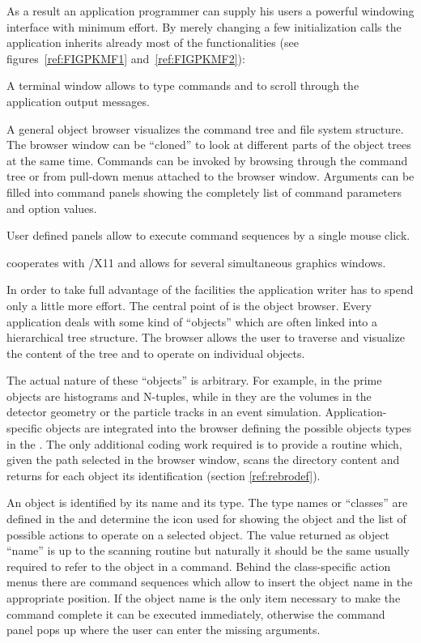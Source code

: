 As a result an application programmer can supply his users a powerful
windowing interface with minimum effort.
By merely changing a few \KUIP{} initialization calls the application
inherits already most of the \KUIPMotif{} functionalities 
(see figures~\ref{ref:FIGPKMF1} and~\ref{ref:FIGPKMF2}):
\begin{UL}
\item
A terminal window allows to type commands and to scroll through the
application output messages.
\item
A general object browser visualizes the command tree and file system
structure.
The browser window can be ``cloned'' to look at different parts of the
object trees at the same time.
Commands can be invoked by browsing through the command tree or from
pull-down menus attached to the browser window.
Arguments can be filled into command panels showing the completely list
of command parameters and option values.
\item
User defined panels allow to execute command sequences by a single
mouse click.
\item
\KUIPMotif{} cooperates with \HIGZ{}/X11 and allows for
several simultaneous graphics windows.
\end{UL}

In order to take full advantage of the \KUIPMotif{} facilities the
application writer has to spend only a little more effort.
The central point of \KUIPMotif{} is the object browser.
Every application deals with some kind of ``objects'' which are often
linked into a hierarchical tree structure.
The \KUIPMotif{} browser allows the user to traverse and visualize the
content of the tree and to operate on individual objects.

The actual nature of these ``objects'' is arbitrary.
For example, in \PAW{} the prime objects are histograms and N-tuples,
while in \GEANT{} they are the volumes in the detector geometry or the
particle tracks in an event simulation.
Application-specific objects are integrated into the browser defining
the possible objects types in the \CDF{}.
The only additional coding work required is to provide a routine
which, given the path selected in the browser window, scans the
directory content and returns for each object its identification
(section \ref{ref:rebrodef}).

An object is identified by its name and its type.
The type names or ``classes'' are defined in the \CDF{} and determine
the icon used for showing the object and the list of possible actions
to operate on a selected object.
The value returned as object ``name'' is up to the
scanning routine but naturally it should be the same usually required
to refer to the object in a command.
Behind the class-specific action menus there are command sequences
which allow to insert the object name in the appropriate position.
If the object name is the only item necessary to make the command
complete it can be executed immediately, otherwise the command
panel pops up where the user can enter the missing arguments. 

